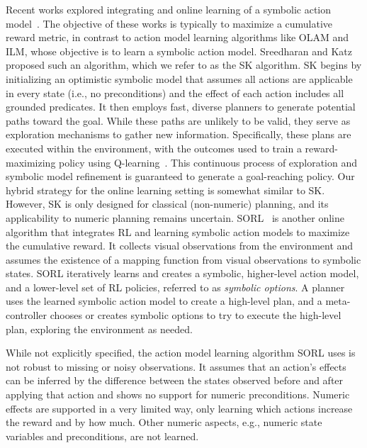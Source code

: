 Recent works explored integrating \rl and online learning of a symbolic action model~\cite{jin2022creativity,sreedharan2023optimistic}. 
The objective of these works is typically to maximize a cumulative reward metric, in contrast to action model learning algorithms like OLAM and ILM, whose objective is to learn a symbolic action model.
Sreedharan and Katz~\cite{sreedharan2023optimistic} proposed such an algorithm, which we refer to as the SK algorithm. SK begins by initializing an optimistic symbolic model that assumes all actions are applicable in every state (i.e., no preconditions) and the effect of each action includes all grounded predicates. It then employs fast, diverse planners to generate potential paths toward the goal. While these paths are unlikely to be valid, they serve as exploration mechanisms to gather new information. 
Specifically, these plans are executed within the environment, with the outcomes used to train a reward-maximizing policy using Q-learning~\citep{watkins1989learning,watkins1992q}.
This continuous process of exploration and symbolic model refinement is guaranteed to generate a goal-reaching policy. Our hybrid strategy for the online learning setting is somewhat similar to SK. However, SK is only designed for classical (non-numeric) planning, and its applicability to numeric planning remains uncertain. 
SORL~\citep{jin2022creativity} is another online algorithm that integrates RL and learning symbolic action models to maximize the cumulative reward. 
It collects visual observations from the environment and assumes the existence of a mapping function from visual observations to symbolic states. 
SORL iteratively learns and creates 
a symbolic, higher-level action model, 
and a lower-level set of RL policies, referred to as \emph{symbolic options}. 
A planner uses the learned symbolic action model to create a high-level plan, and a meta-controller chooses or creates symbolic options to try to execute the high-level plan, exploring the environment as needed. 

While not explicitly specified, the action model learning algorithm SORL uses is not robust to missing or noisy observations. It assumes that an action's effects can be inferred by the difference between the states observed before and after applying that action and shows no support for numeric preconditions. Numeric effects are supported in a very limited way, only learning which actions increase the reward and by how much. Other numeric aspects, e.g., numeric state variables and preconditions, are not learned.


